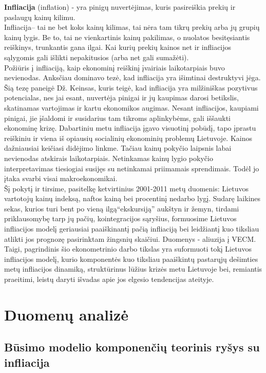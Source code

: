 \documentclass[a4paper]{article}
\begin{document}
\textbf{Infliacija} (inflation) - yra pinigų nuvertėjimas, kuris pasireiškia prekių ir paslaugų kainų kilimu. \\
Infliacija– tai ne bet koks kainų  kilimas, tai nėra tam  tikrų prekių arba jų grupių kainų lygis. Be to, tai ne vienkartinis kainų pakilimas, o nuolatos besitęsiantis reiškinys, trunkantis gana ilgai. Kai kurių prekių kainos net ir infliacijos sąlygomis gali išlikti nepakitusios (arba net gali sumažėti).\\
Požiūris į infliaciją, kaip ekonominį reiškinį įvairiais laikotarpiais buvo nevienodas. Anksčiau dominavo tezė, kad infliacija yra išimtinai destruktyvi jėga. Šią tezę paneigė Dž. Keinsas, kuris teigė, kad infliacija yra milžiniškas pozytivus potencialas, nes jai esant, nuvertėja pinigai ir jų kaupimas darosi betikslis, skatinamas vartojimas ir kartu ekonomikos augimas. Nesant infliacijos, kaupiami pinigai, jie įšaldomi ir susidarius tam tikroms aplinkybėms, gali iššaukti ekonominę krizę. Dabartiniu metu infliacija įgavo visuotinį pobūdį, tapo įprastu reiškiniu ir viena iš opiausių socialinių ekonominių problemų Lietuvoje. Kainos dažniausiai keičiasi didėjimo linkme. Tačiau kainų pokyčio laipsnis labai nevienodas atskirais laikotarpiais. Netinkamas kainų lygio pokyčio interpretavimas tiesiogiai susijęs su netinkamai priimamais sprendimais. Todėl jo įtaka svarbi visai makroekonomikai.\\
Šį pokytį ir tirsime, pasitelkę ketvirtinius 2001-2011 metų duomenis: Lietuvos vartotojų kainų indeksą, naftos kainą bei procentinį nedarbo lygį. Sudarę laikines sekas, kurios turi bent po  vieną ilgą“ekskursiją” aukštyn ir žemyn,  tirdami priklausomybę tarp jų pačių, kointegracijos sąryšius, formuosime Lietuvos infliacijos modelį geriausiai paaiškinantį pačią infliaciją bei leidžiantį kuo tiksliau atlikti jos prognozę pasirinktam žingsnių skaičiui. Duomenys - aliuzija į VECM.\\
Taigi, pagrindinis šio ekonometrinio darbo tikslas yra suformuoti tokį Lietuvos infliacijos modelį, kurio komponentės kuo tiksliau paaiškintų pastarųjų dešimties metų  infliacijos dinamiką, struktūrinus lūžius krizės metu Lietuvoje bei, remiantis praeitimi,  leistų daryti išvadas apie jos elgesio tendencijas ateityje.

\newpage
\section{Duomenų analizė}

	\subsection{Būsimo modelio komponenčių teorinis ryšys su infliacija}
	
\end{document}
